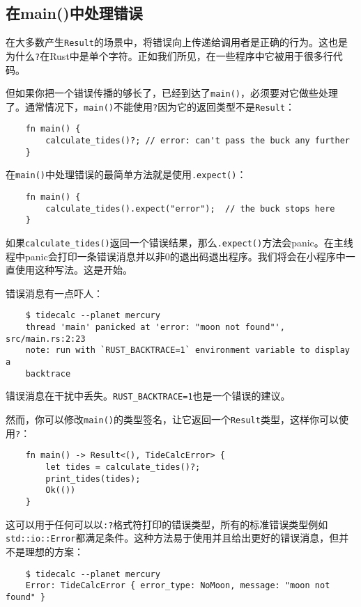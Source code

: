 \subsection{在main()中处理错误}
在大多数产生\texttt{Result}的场景中，将错误向上传递给调用者是正确的行为。这也是为什么\texttt{?}在Rust中是单个字符。正如我们所见，在一些程序中它被用于很多行代码。

但如果你把一个错误传播的够长了，已经到达了\texttt{main()}，必须要对它做些处理了。通常情况下，\texttt{main()}不能使用\texttt{?}因为它的返回类型不是\texttt{Result}：
\begin{verbatim}
    fn main() {
        calculate_tides()?; // error: can't pass the buck any further
    }
\end{verbatim}

在\texttt{main()}中处理错误的最简单方法就是使用\texttt{.expect()}：
\begin{verbatim}
    fn main() {
        calculate_tides().expect("error");  // the buck stops here
    }
\end{verbatim}

如果\texttt{calculate\_tides()}返回一个错误结果，那么\texttt{.expect()}方法会panic。在主线程中panic会打印一条错误消息并以非0的退出码退出程序。我们将会在小程序中一直使用这种写法。这是开始。

错误消息有一点吓人：
\begin{verbatim}
    $ tidecalc --planet mercury
    thread 'main' panicked at 'error: "moon not found"', src/main.rs:2:23
    note: run with `RUST_BACKTRACE=1` environment variable to display a
    backtrace
\end{verbatim}
错误消息在干扰中丢失。\texttt{RUST\_BACKTRACE=1}也是一个错误的建议。

然而，你可以修改\texttt{main()}的类型签名，让它返回一个\texttt{Result}类型，这样你可以使用\texttt{?}：
\begin{verbatim}
    fn main() -> Result<(), TideCalcError> {
        let tides = calculate_tides()?;
        print_tides(tides);
        Ok(())
    }
\end{verbatim}

这可以用于任何可以以\texttt{{:?}}格式符打印的错误类型，所有的标准错误类型例如\\
\texttt{std::io::Error}都满足条件。这种方法易于使用并且给出更好的错误消息，但并不是理想的方案：
\begin{verbatim}
    $ tidecalc --planet mercury
    Error: TideCalcError { error_type: NoMoon, message: "moon not found" }
\end{verbatim}

